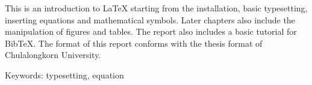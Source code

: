 \begin{englishabstract}
This is an introduction to {\LaTeX} starting from the installation, basic typesetting, inserting equations and mathematical symbols.
Later chapters also include the manipulation of figures and tables. The report also includes a basic tutorial for BibTeX.
The format of this report conforms with the thesis format of Chulalongkorn University.

\noindent
Keywords: typesetting, equation 
\end{englishabstract}

